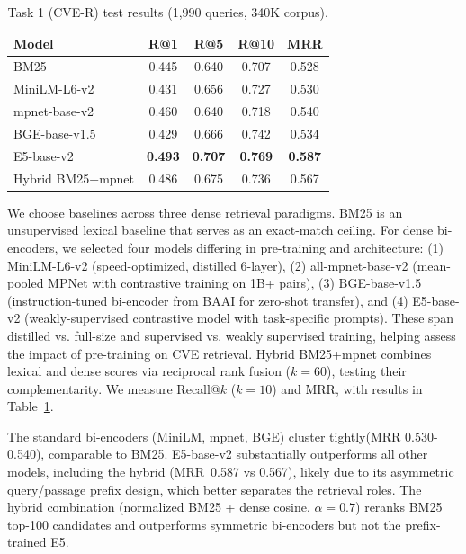 \documentclass{article}
\begin{document}
\begin{table}
\vspace{-4pt}
\centering
\small
\setlength{\tabcolsep}{3pt}
\caption{Task 1 (CVE-R) test results (1,990 queries, 340K corpus).}
\label{tab:task1-results}
\begin{tabular}{lcccc}
\toprule
\textbf{Model} & \textbf{R@1} & \textbf{R@5} & \textbf{R@10} & \textbf{MRR} \\
\midrule
BM25 & 0.445 & 0.640 & 0.707 & 0.528 \\
MiniLM-L6-v2 & 0.431 & 0.656 & 0.727 & 0.530 \\
mpnet-base-v2 & 0.460 & 0.640 & 0.718 & 0.540 \\
BGE-base-v1.5 & 0.429 & 0.666 & 0.742 & 0.534 \\
E5-base-v2 & \textbf{0.493} & \textbf{0.707} & \textbf{0.769} & \textbf{0.587} \\
\midrule
Hybrid BM25+mpnet & 0.486 & 0.675 & 0.736 & 0.567 \\
\bottomrule
\end{tabular}
\vspace{-4pt}
\end{table}

We choose baselines across three dense retrieval paradigms. BM25 is an unsupervised lexical baseline that serves as an exact-match ceiling. For dense bi-encoders, we selected four models differing in pre-training and architecture: (1) MiniLM-L6-v2 (speed-optimized, distilled 6-layer), (2) all-mpnet-base-v2 (mean-pooled MPNet with contrastive training on 1B+ pairs), (3) BGE-base-v1.5 (instruction-tuned bi-encoder from BAAI for zero-shot transfer), and (4) E5-base-v2 (weakly-supervised contrastive model with task-specific prompts). These span distilled vs. full-size and supervised vs. weakly supervised training, helping assess the impact of pre-training on CVE retrieval. Hybrid BM25+mpnet combines lexical and dense scores via reciprocal rank fusion ($ k=60$), testing their complementarity. We measure Recall@$k$ ($ k= {10}$) and MRR, with results in Table~\ref{tab:task1-results}.

The standard bi-encoders (MiniLM, mpnet, BGE) cluster tightly(MRR 0.530-0.540), comparable to BM25. E5-base-v2 substantially outperforms all other models, including the hybrid (MRR~0.587 vs 0.567), likely due to its asymmetric query/passage prefix design, which better separates the retrieval roles. The hybrid combination (normalized BM25 + dense cosine, $\alpha{=}0.7$) reranks BM25 top-100 candidates and outperforms symmetric bi-encoders but not the prefix-trained E5.
\end{document}
